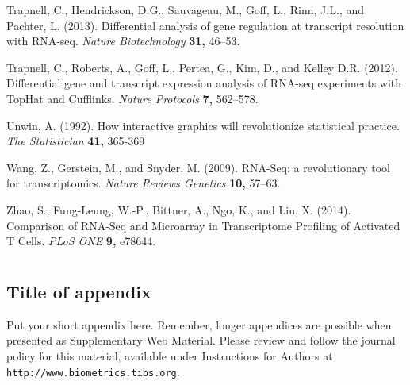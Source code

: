 \documentclass[useAMS,referee]{biom}
\begin{document}
\begin{thebibliography}{}
\bibitem{ } Trapnell, C., Hendrickson, D.G., Sauvageau, M., Goff, L., Rinn, J.L., and Pachter, L. (2013). Differential analysis of gene regulation at transcript resolution with RNA-seq. \textit{Nature Biotechnology} \textbf{31,} 46–53.

\bibitem{ } Trapnell, C., Roberts, A., Goff, L., Pertea, G., Kim, D., and Kelley D.R. (2012). Differential gene and transcript expression analysis of RNA-seq experiments with TopHat and Cufflinks. \textit{Nature Protocols} \textbf{7,} 562–578.

\bibitem{ } Unwin, A. (1992). How interactive graphics will revolutionize statistical practice. \textit{The Statistician} \textbf{41,} 365-369

\bibitem{ } Wang, Z., Gerstein, M., and Snyder, M. (2009). RNA-Seq: a revolutionary tool for transcriptomics. \textit{Nature Reviews Genetics} \textbf{10,} 57–63.

\bibitem{ } Zhao, S., Fung-Leung, W.-P., Bittner, A., Ngo, K., and Liu, X. (2014). Comparison of RNA-Seq and Microarray in Transcriptome Profiling of Activated T Cells. \textit{PLoS ONE} \textbf{9,} e78644.





\end{thebibliography}

\appendix


\section{}
\subsection{Title of appendix}

Put your short appendix here.  Remember, longer appendices are
possible when presented as Supplementary Web Material.  Please 
review and follow the journal policy for this material, available
under Instructions for Authors at \texttt{http://www.biometrics.tibs.org}.

\label{lastpage}
\end{document}
